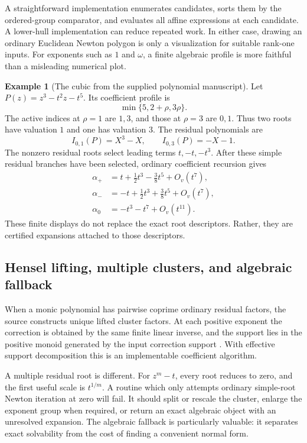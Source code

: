 \documentclass[11pt,letterpaper]{article}
\numberwithin{equation}{section}
\theoremstyle{definition}
\newtheorem{example}[theorem]{Example}
\theoremstyle{remark}\newtheorem{remark}[theorem]{Remark}
\newcommand{\Oh}[1]{O_v(t^{#1})}
\begin{document}
A straightforward implementation enumerates candidates, sorts them by the
ordered-group comparator, and evaluates all affine expressions at each
candidate. A lower-hull implementation can reduce repeated work. In either
case, drawing an ordinary Euclidean Newton polygon is only a visualization
for suitable rank-one inputs. For exponents such as $1$ and $\omega$, a
finite algebraic profile is more faithful than a misleading numerical plot.

\begin{example}[The cubic from the supplied polynomial manuscript]
\label{ex:cubic}
Let $P(z)=z^3-t^2z-t^5$. Its coefficient profile is
\[
 \min\{5,2+\rho,3\rho\}.
\]
The active indices at $\rho=1$ are $1,3$, and those at $\rho=3$ are $0,1$.
Thus two roots have valuation $1$ and one has valuation $3$. The residual
polynomials are
\[
 I_{0,1}(P)=X^3-X,\qquad I_{0,3}(P)=-X-1.
\]
The nonzero residual roots select leading terms $t,-t,-t^3$. After these
simple residual branches have been selected, ordinary coefficient recursion
gives
\begin{align*}
 \alpha_+&=t+\tfrac12t^3-\tfrac38t^5+\Oh7,\\
 \alpha_-&=-t+\tfrac12t^3+\tfrac38t^5+\Oh7,\\
 \alpha_0&=-t^3-t^7+\Oh{11}.
\end{align*}
These finite displays do not replace the exact root descriptors. Rather,
they are certified expansions attached to those descriptors.
\end{example}

\subsection{Hensel lifting, multiple clusters, and algebraic fallback}
When a monic polynomial has pairwise coprime ordinary residual factors,
the source constructs unique lifted cluster factors. At each positive
exponent the correction is obtained by the same finite linear inverse, and
the support lies in the positive monoid generated by the input correction
support \cite{SourcePolynomial}. With effective support decomposition this
is an implementable coefficient algorithm.

A multiple residual root is different. For $z^m-t$, every root reduces to
zero, and the first useful scale is $t^{1/m}$. A routine which only attempts
ordinary simple-root Newton iteration at zero will fail. It should split or
rescale the cluster, enlarge the exponent group when required, or return an
exact algebraic object with an unresolved expansion. The algebraic fallback
is particularly valuable: it separates exact solvability from the cost of
finding a convenient normal form.
\end{document}

